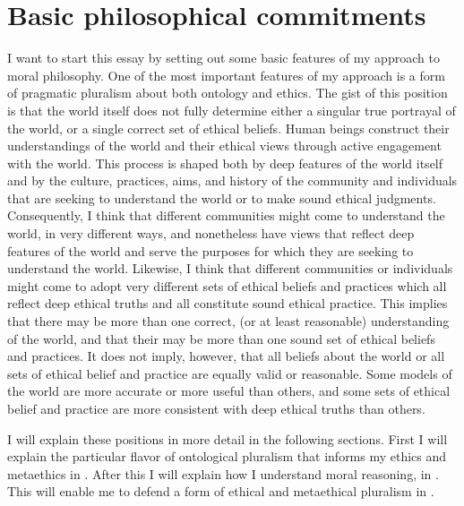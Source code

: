 \chapter{Basic philosophical commitments}
\label{chap:basic-comm}
I want to start this essay by setting out some basic features of my approach to
moral philosophy.
One of the most important features of my approach is a form of pragmatic pluralism
about both ontology and ethics.
The gist of this position is that the world itself does not fully determine either
a singular true portrayal of the world, or a single correct set of ethical
beliefs.
Human beings construct their understandings of the world and their ethical views
through active engagement with the world.
This process is shaped both by deep features of the world itself and by the
culture, practices, aims, and history of the community and individuals that are
seeking to understand the world or to make sound ethical judgments.
Consequently, I think that different communities might come to understand the
world, in very different ways, and nonetheless have views that reflect deep
features of the world and serve the purposes for which they are seeking to
understand the world.
Likewise, I think that different communities or individuals might come to adopt
very different sets of ethical beliefs and practices which all reflect deep
ethical truths and all constitute sound ethical practice.
This implies that there may be more than one correct, (or at least reasonable)
understanding of the world, and that their may be more than one sound set of
ethical beliefs and practices.
It does not imply, however, that all beliefs about the world or all sets of
ethical belief and practice are equally valid or reasonable.
Some models of the world are more accurate or more useful than others, and some
sets of ethical belief and practice are more consistent with deep ethical truths
than others.

I will explain these positions in more detail in the following sections.
First I will explain the particular flavor of ontological pluralism that informs
my ethics and metaethics in .
After this I will explain how I understand moral reasoning, in
. This will enable me to defend a form of ethical and
metaethical pluralism in .
